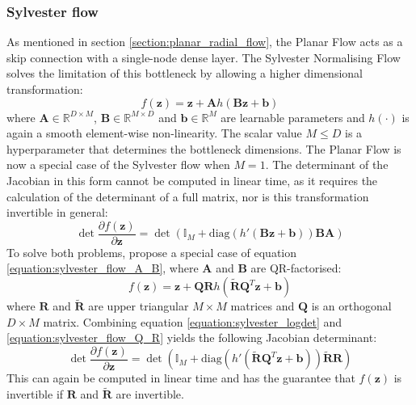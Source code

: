 \documentclass{report}
\newcommand{\bA}{\mathbf{A}}
\newcommand{\bB}{\mathbf{B}}
\newcommand{\bb}{\mathbf{b}}
\newcommand{\eye}{\mathbb{I}}
\newcommand{\bQ}{\mathbf{Q}}
\newcommand{\R}{\mathbb{R}}
\newcommand{\bR}{\mathbf{R}}
\newcommand{\bz}{\mathbf{z}}
\newcommand{\parfrac}[2]{\frac{\partial #1}{\partial#2}}
\begin{document}
\subsubsection{Sylvester flow}
As mentioned in section \ref{section:planar_radial_flow}, the Planar Flow acts as a skip connection with a single-node dense layer. The Sylvester Normalising Flow \parencite{berg2018sylvester} solves the limitation of this bottleneck by allowing a higher dimensional transformation:
\begin{equation}\label{equation:sylvester_flow_A_B}
    f(\bz) = \bz + \bA h(\bB\bz + \bb)
\end{equation}
where $\bA \in \R^{D\times M}$, $\bB \in \R^{M\times D}$ and $\bb \in \R^M$ are learnable parameters and $h(\cdot)$ is again a smooth element-wise non-linearity. The scalar value $M \leq D$ is a hyperparameter that determines the bottleneck dimensions. The Planar Flow is now a special case of the Sylvester flow when $M=1$. The determinant of the Jacobian in this form cannot be computed in linear time, as it requires the calculation of the determinant of a full matrix, nor is this transformation invertible in general:
\begin{equation}\label{equation:sylvester_logdet}
    \det \parfrac{f(\bz)}{\bz} = \det (\eye_M + \text{diag}(h'(\bB\bz + \bb))\bB\bA)
\end{equation}
To solve both problems, \textcite{berg2018sylvester} propose a special case of equation \ref{equation:sylvester_flow_A_B}, where $\bA$ and $\bB$ are QR-factorised:
\begin{equation}\label{equation:sylvester_flow_Q_R}
    f(\bz) = \bz + \bQ\bR h(\widetilde{\bR}\bQ^T\bz + \bb)
\end{equation}
where $\bR$ and $\widetilde{\bR}$ are upper triangular $M \times M$ matrices and $\bQ$ is an orthogonal $D \times M$ matrix. Combining equation \ref{equation:sylvester_logdet} and \ref{equation:sylvester_flow_Q_R} yields the following Jacobian determinant:
\begin{equation}
        \det \parfrac{f(\bz)}{\bz} = \det (\eye_M + \text{diag}(h'(\widetilde{\bR}\bQ^T\bz + \bb))\widetilde{\bR}\bR)
\end{equation}
This can again be computed in linear time and has the guarantee that $f(\bz)$ is invertible if $\bR$ and $\widetilde{\bR}$ are invertible. 
\end{document}
